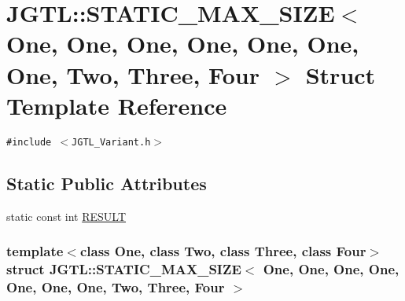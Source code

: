 \hypertarget{struct_j_g_t_l_1_1_s_t_a_t_i_c___m_a_x___s_i_z_e_3_01_one_00_01_one_00_01_one_00_01_one_00_01_on1ea2882b2f3315e024773e1becf2883f}{
\section{JGTL::STATIC\_\-MAX\_\-SIZE$<$ One, One, One, One, One, One, One, Two, Three, Four $>$ Struct Template Reference}
\label{struct_j_g_t_l_1_1_s_t_a_t_i_c___m_a_x___s_i_z_e_3_01_one_00_01_one_00_01_one_00_01_one_00_01_on1ea2882b2f3315e024773e1becf2883f}
}
{\tt \#include $<$JGTL\_\-Variant.h$>$}

\subsection*{Static Public Attributes}
\begin{CompactItemize}
\item 
static const int \hyperlink{struct_j_g_t_l_1_1_s_t_a_t_i_c___m_a_x___s_i_z_e_3_01_one_00_01_one_00_01_one_00_01_one_00_01_on1ea2882b2f3315e024773e1becf2883f_462f57f9c16ebe6c225388a01a026a74}{RESULT}
\end{CompactItemize}
\subsubsection*{template$<$class One, class Two, class Three, class Four$>$ struct JGTL::STATIC\_\-MAX\_\-SIZE$<$ One, One, One, One, One, One, One, Two, Three, Four $>$}



